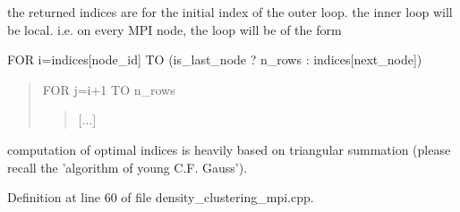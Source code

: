 the returned indices are for the initial index of the outer loop. the inner loop will be local. i.\-e. on every M\-P\-I node, the loop will be of the form\par
\par
 F\-O\-R i=indices\mbox{[}node\-\_\-id\mbox{]} T\-O (is\-\_\-last\-\_\-node ? n\-\_\-rows \-: indices\mbox{[}next\-\_\-node\mbox{]})\par
\begin{quotation}
F\-O\-R j=i+1 T\-O n\-\_\-rows\par
\begin{quotation}
\mbox{[}...\mbox{]}

\end{quotation}


\end{quotation}


computation of optimal indices is heavily based on triangular summation (please recall the 'algorithm of young C.\-F. Gauss'). 

Definition at line 60 of file density\-\_\-clustering\-\_\-mpi.\-cpp.

